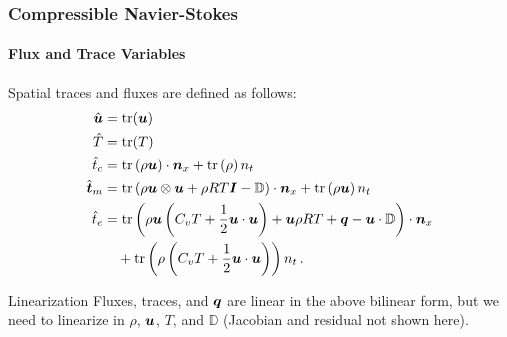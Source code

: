 \documentclass[18pt,xcolor=table]{beamer}
\begin{document}
\begin{frame}[t]
\frametitle{Compressible Navier-Stokes}
\framesubtitle{Flux and Trace Variables}  %
Spatial traces and fluxes are defined as follows:
\begin{equation*}
\begin{aligned}
\hat{\boldsymbol u}&=\operatorname*{tr}(\boldsymbol u)\\
\hat T&=\operatorname*{tr}(T)\\
\hat t_c&=\operatorname*{tr}\left( \rho\boldsymbol u \right)\cdot\boldsymbol n_x
+\operatorname*{tr}\left( \rho \right)n_t\\
\hat{\boldsymbol t}_m&=\operatorname*{tr}\left( \rho\boldsymbol u\otimes\boldsymbol u+\rho RT\boldsymbol I-\mathbb{D} \right)\cdot\boldsymbol n_x
+\operatorname*{tr}\left( \rho\boldsymbol u \right) n_t\\
\hat t_e&=\operatorname*{tr}\left( \rho\boldsymbol u\left( C_v T+\frac{1}{2}\boldsymbol u\cdot\boldsymbol u \right)+\boldsymbol u\rho RT+\boldsymbol q-\boldsymbol u\cdot\mathbb{D} \right)\cdot\boldsymbol n_x\\
&\quad+\operatorname*{tr}\left( \rho\left( C_v T+\frac{1}{2}\boldsymbol u\cdot\boldsymbol u \right) \right)n_t\,.
\end{aligned}
\end{equation*}
\begin{block}{Linearization}
Fluxes, traces, and $\boldsymbol q$ are linear in the above bilinear form, but we need to linearize in $\rho$, $\boldsymbol u$, $T$, and $\mathbb{D}$ 
(Jacobian and residual not shown here).
\end{block}
\end{frame}

\end{document}
